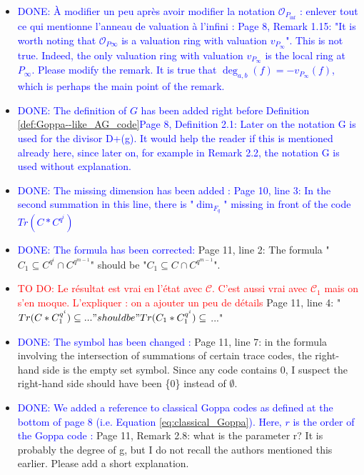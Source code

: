 \documentclass[12pt,a4paper]{amsart}
\newcommand\TODO[1]{\textcolor{red}{TO DO: #1}}
\newcommand\DONE[1]{\textcolor{blue}{DONE: #1}}
\begin{document}
\begin{itemize}
\item  \DONE{À modifier un peu après avoir modifier la notation $\mathcal{O}_{P_{\inf}}$ : enlever tout ce qui mentionne l'anneau de valuation à l'infini : Page 8, Remark 1.15: "It is worth noting that $\mathcal{O}_{P\infty}$ is a valuation ring with valuation $v_{P_\infty}$". This is not true. Indeed, the only valuation ring with valuation $v_{P_\infty}$ is the local ring at $P_\infty$. Please modify the remark. It is true that $\deg_{a,b}(f)=-v_{P_\infty}(f)$, which is perhaps the main point of the remark.}

\item \DONE{The definition of $G$ has been added right before Definition \ref{def:Goppa--like_AG_code}Page 8, Definition 2.1: Later on the notation G is used for the divisor D+(g). It would help the reader if this is mentioned already here, since later on, for example in Remark 2.2, the notation G is used without explanation.}



\item \DONE{The missing dimension has been added : Page 10, line 3: In the second summation in this line, there is "$\dim_{F_{q}}$" missing in front of the code $Tr(C*C^{q^i})$}

\item \DONE{The formula has been corrected: }Page 11, line 2: The formula "$C_1 \subseteq C^{q^i} \cap C^{q^{m-1}}$" should be "$C_1 \subseteq C \cap C^{q^{m-1}}$". 

\item \TODO{Le résultat est vrai en l'état avec $\mathcal{C}$. C'est aussi vrai avec $\mathcal{C}_1$ mais on s'en moque. L'expliquer : on a ajouter un peu de détails }Page 11, line 4: "$Tr(C*C_1^{q^i}) \subseteq ..." should be "Tr(C_1*C_1^{q^i}) \subseteq$ ..."

\item \DONE{The symbol has been changed : }Page 11, line 7: in the formula involving the intersection of summations of certain trace codes, the right-hand side is the empty set symbol. Since any code contains 0, I suspect the right-hand side should have been \{0\} instead of $\emptyset$.

\item \DONE{ We added a reference to classical Goppa codes as defined at the bottom of page 8 (i.e. Equation \eqref{eq:classical_Goppa}). Here, $r$ is the order of the Goppa code : } Page 11, Remark 2.8: what is the parameter r? It is probably the degree of g, but I do not recall the authors mentioned this earlier. Please add a short explanation.


\end{itemize}
\end{document}
